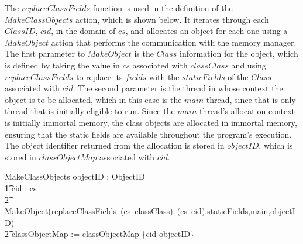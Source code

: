 The $replaceClassFields$ function is used in the definition of the
$MakeClassObjects$ action, which is shown below.
It iterates through each $ClassID$, $cid$, in the domain of $cs$, and
allocates an object for each one using a $MakeObject$ action that
performs the communication with the memory manager.
The first parameter to $MakeObject$ is the $Class$ information for the
object, which is defined by taking the value in $cs$ associated with
$classClass$ and using $replaceClassFields$ to replace its $fields$
with the $staticFields$ of the $Class$ associated with $cid$.
The second parameter is the thread in whose context the object is to
be allocated, which in this case is the $main$ thread, since that is
only thread that is initially eligible to run.
Since the $main$ thread's allocation context is initially immortal
memory, the class objects are allocated in immortal memory, ensuring
that the static fields are available throughout the program's
execution.
The object identifier returned from the allocation is stored in
$objectID$, which is stored in $classObjectMap$ associated with $cid$.
\begin{circusaction}
  MakeClassObjects \circdef \circvar objectID : ObjectID \circspot \\
  \t1 \Semi cid : \dom cs \circspot \\
  \t2 MakeObject(replaceClassFields~(cs~classClass)~(cs~cid).staticFields,main,objectID) \circseq \\
  \t2 classObjectMap := classObjectMap \cup \{cid \mapsto objectID\}
\end{circusaction}

